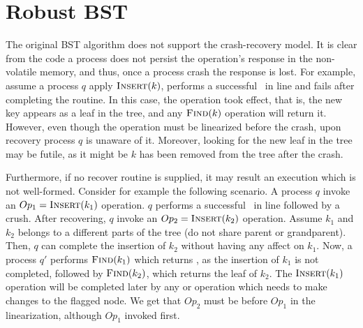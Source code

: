 

\section{Robust BST}
\label{section:BST}

The original BST algorithm does not support the crash-recovery model. It is clear from the code a process does not persist the operation's response in the non-volatile memory, and thus, once a process crash the response is lost. For example, assume a process $q$ apply $\mbox{\sc Insert} (k)$, performs a successful \CASB\ in line  and fails after completing the  routine. In this case, the  operation took effect, that is, the new key appears as a leaf in the tree, and any $\mbox{\sc Find} (k)$ operation will return it. However, even though the operation must be linearized before the crash, upon recovery process $q$ is unaware of it. Moreover, looking for the new leaf in the tree may be futile, as it might be $k$ has been removed from the tree after the crash.

Furthermore, if no recover routine is supplied, it may result an execution which is not well-formed. Consider for example the following scenario. A process $q$ invoke an $Op_1 = \mbox{\sc Insert}(k_1)$ operation. $q$ performs a successful \CASB\ in line  followed by a crush. After recovering, $q$ invoke an $Op_2 = \mbox{\sc Insert}(k_2)$ operation. Assume $k_1$ and $k_2$ belongs to a different parts of the tree (do not share parent or grandparent). Then, $q$ can complete the insertion of $k_2$ without having any affect on $k_1$. Now, a process $q'$ performs $\mbox{\sc Find}(k_1)$ which returns \NULL, as the insertion of $k_1$ is not completed, followed by $\mbox{\sc Find}(k_2)$, which returns the leaf of $k_2$. The $\mbox{\sc Insert}(k_1)$ operation will be completed later by any  or  operation which needs to make changes to the flagged node. We get that $Op_2$ must be before $Op_1$ in the linearization, although $Op_1$ invoked first.

